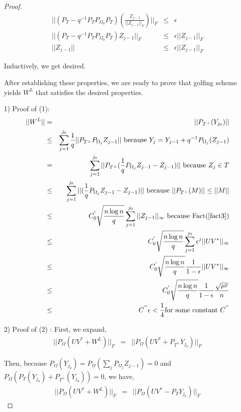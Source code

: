\begin{proof}
\begin{eqnarray*}
||(P_{T}-q^{-1}P_{T}P_{\Omega_{0}}P_{T})(\frac{Z_{j-1}}{||Z_{j-1}||_{F}})||_{F} & \le & \epsilon\\
||(P_{T}-q^{-1}P_{T}P_{\Omega_{0}}P_{T})Z_{j-1}||_{F} & \le & \epsilon||Z_{j-1}||_{F}\\
||Z_{j-1}|| & \le & \epsilon||Z_{j-1}||_{F}
\end{eqnarray*}


Inductively, we get desired.

After establishing these properties, we are ready to prove that golfing scheme yields $W^{L}$ that satisfies the desired properties.

1) Proof of (1): 
\begin{eqnarray*}
||W^{L}|| & = & ||P_{T^{\bot}}(Y_{j_{0}})||\\
 & \le & \sum_{j=1}^{j_{0}}\frac{1}{q}||P_{T^{\bot}}P_{\Omega_{j}}Z_{j-1}||\text{ because }Y_{j}=Y_{j-1}+q^{-1}P_{\Omega_{j}}(Z_{j-1})\\
 & = & \sum_{j=1}^{j_{0}}||P_{T^{\bot}}(\frac{1}{q}P_{\Omega_{j}}Z_{j-1}-Z_{j-1})||\text{ because }Z_{j}\in T\\
 & \le & \sum_{j=1}^{j_{0}}||(\frac{1}{q}P_{\Omega_{j}}Z_{j-1}-Z_{j-1})||\text{ because }||P_{T^{\bot}}(M)||\le||M||\\
 & \le & C_{0}^{'}\sqrt{\frac{n\log n}{q}}\sum_{j=1}^{j_{0}}||Z_{j-1}||_{\infty}\text{ because Fact(\ref{fact3})}\\
 & \le & C_{0}^{'}\sqrt{\frac{n\log n}{q}}\sum_{j=1}^{j_{0}}\epsilon^{j}||UV^{*}||_{\infty}\\
 & \le & C_{0}^{'}\sqrt{\frac{n\log n}{q}}\frac{1}{1-\epsilon}||UV^{*}||_{\infty}\\
 & \le & C_{0}^{'}\sqrt{\frac{n\log n}{q}}\frac{1}{1-\epsilon}\frac{\sqrt{\mu r}}{n}\\
 & \le & C^{''}\epsilon<\frac{1}{4}\text{for some constant }C^{''}
\end{eqnarray*}


2) Proof of (2) : First, we expand, 
\begin{eqnarray*}
||P_{\Omega}(UV^{*}+W^{L})||_{F} & = & ||P_{\Omega}(UV^{*}+P_{T^{\bot}}Y_{j_{0}})||_{F}
\end{eqnarray*}

Then, because $P_{\Omega}(Y_{j_{0}})=P_{\Omega}(\sum_{j}P_{\Omega_{j}}Z_{j-1})=0$ and $P_{\Omega}(P_{T}(Y_{j_{0}})+P_{T^{\bot}}(Y_{j_{0}}))=0$, we have, 
\begin{eqnarray*}
||P_{\Omega}(UV^{*}+W^{L})||_{F} & = & ||P_{\Omega}(UV^{*}-P_{T}Y_{j_{0}})||_{F}
\end{eqnarray*}



\end{proof}
